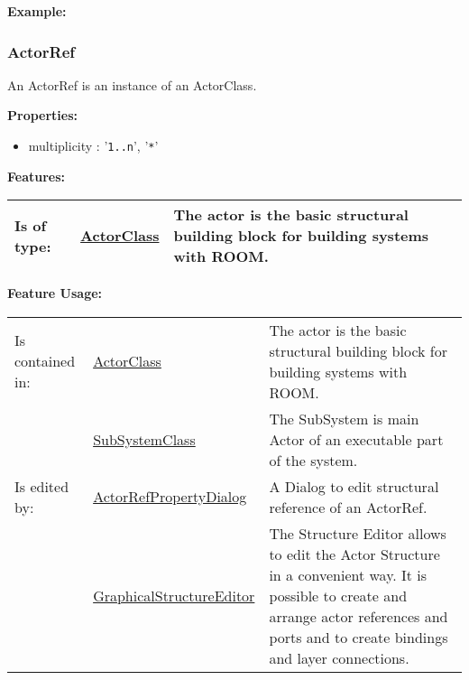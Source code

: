 		\textbf{Example:}
		
			
	
	\vspace{\baselineskip}
	\vspace{\baselineskip}
	\vspace{\baselineskip}
	
	\subsubsection{ActorRef}
		\hypertarget{ref:ActorRef}{}
		
		An ActorRef is an instance of an ActorClass.
		
		
		\textbf{Properties:}
		\begin{itemize}
		\item multiplicity : '\verb|1..n|', '\verb|*|'
		\end{itemize}
		
		\begingroup
		\textbf{Features:}
		\renewcommand{\arraystretch}{1.8} %
		\begin{longtable}{l|l p{}}
			\hline
		Is of type: & \tabitem \hyperlink{ref:ActorClass}{ActorClass}  & The actor is the basic structural building block for building systems with ROOM.\\
		\hline
		\end{longtable}
		\endgroup
		
		\begingroup
		\textbf{Feature Usage:}
		\renewcommand{\arraystretch}{1.8} %
		\begin{longtable}{l|l p{}}
			\hline
		Is contained in: & \tabitem \hyperlink{ref:ActorClass}{ActorClass}  & The actor is the basic structural building block for building systems with ROOM.\\
		& \tabitem \hyperlink{ref:SubSystemClass}{SubSystemClass}  & The SubSystem is main Actor of an executable part of the system.  \\
		\hline
		Is edited by: & \tabitem \hyperlink{ref:ActorRefPropertyDialog}{ActorRefPropertyDialog}  & A Dialog to edit structural reference of an ActorRef.
		\\
		& \tabitem \hyperlink{ref:GraphicalStructureEditor}{GraphicalStructureEditor}  & The Structure Editor allows to edit the Actor Structure in a convenient way. It is possible to create and arrange actor references and ports and to create bindings and layer connections. \\
		\hline
		\end{longtable}
		\endgroup
		
